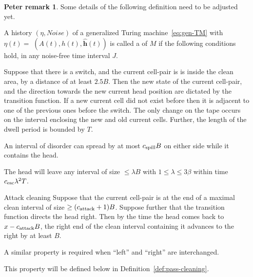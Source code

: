 \documentclass[11pt]{memoir}
\theoremstyle{definition} %
\newtheorem{Premark}{\color{cyan}Peter remark}
\newenvironment{premark}{\begin{Premark}\color{cyan}}{\varqed\end{Premark}}
\renewcommand{\le}{\leq}
\renewcommand{\ge}{\geq}
\renewcommand{\vek}[1]{\mathbf{#1}}
\def\B{B}
\newcommand{\h}{h}
\newcommand{\vhc}{\vek{\hat h}}
\newcommand{\Noise}{\mathit{Noise}}
\newcommand{\Tu}{T}
\newcommand{\cns}[1]{c_{\textrm{\upshape #1}}}
\newcommand{\CAtt}{\cns{attack}}
\newcommand{\CEsc}{\cns{esc}}
\newcommand{\CSpill}{\cns{spill}}
\begin{document}
\begin{premark}
  Some details of the following definition need to be adjusted yet.
\end{premark}


\begin{definition}[Trajectory]\label{def:traj}
\begin{sloppypar}
   A history  \( (\eta, \Noise) \) of a generalized Turing 
machine~\eqref{eq:gen-TM} with \(\eta(t) =\)
\( (A(t), \h(t), \vhc(t)) \)
is called a  of \( M \) if the following conditions hold, in any 
noise-free time interval \( J \).
  \end{sloppypar}
\begin{description}

\item[Transition Function]\label{i:def.traj.transition}
Suppose that there is a switch, and the current cell-pair is 
is inside the clean area, by a distance of at least \( 2.5\B \).
Then the new state of the current cell-pair, and
the direction towards the new current head position
are dictated by the transition function.
If a new current cell did not exist before then it is adjacent to one of the
previous ones before the switch.
The only change on the tape occurs on the interval enclosing the new and old current cells.
Further, the length of the dwell period is bounded by \( \Tu \).

\item[Spill Bound]\label{i:spill-bound}
  An interval of disorder can spread by at most \( \CSpill \B \)
  on either side while it contains the head.

\item[Escape] \label{i:def.traj.escape}
  The head will leave any interval of size \( \le \lambda\B \) with \( 1\le\lambda\le 3\beta \)
  within time \( \CEsc\lambda^{2}\Tu \).

\begin{sloppypar}
\item[Attack cleaning] \label{i:def.traj.attack-cleaning}
Suppose that the current cell-pair is at the end of a maximal clean interval of size
\( \ge (\CAtt+1)\B \).
Suppose further that the transition function directs the head right.
Then by the time the head comes back to \( x-\CAtt \B \), the right end of the clean interval containing it
advances to the right by at least \( \B \).
 \end{sloppypar}

A similar property is required when ``left'' and ``right'' are interchanged.

\item[Pass Cleaning] This property will be defined below in Definition~\ref{def:pass-cleaning}.

\end{description}

\end{definition}
\end{document}
